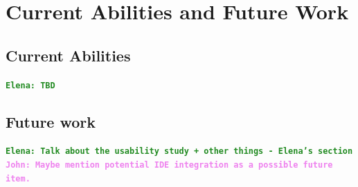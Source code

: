 \documentclass[12pt]{article}
\newcommand{\comment}[1]{{\bf \tt  {#1}}}
\newcommand{\emcomment}[1]{\textcolor{ForestGreen}{\comment{Elena: {#1}}}}
\newcommand{\jwcomment}[1]{\textcolor{violet}{\comment{John: {#1}}}}
\begin{document}
\section{Current Abilities and Future Work}\label{sec:conclusion}
	\subsection{Current Abilities}\label{subsec:current-abilities}
	\emcomment{TBD}
	

	\subsection{Future work}\label{subsec:future}
	\emcomment{Talk about the usability study + other things - Elena's section}
	\jwcomment{Maybe mention potential IDE integration as a possible future item.}



\end{document}
